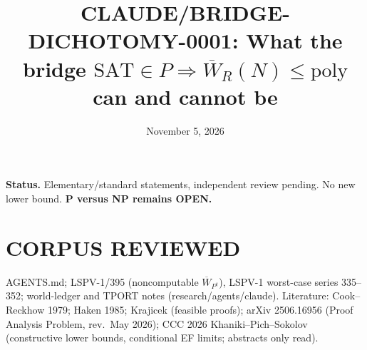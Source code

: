\documentclass[11pt]{article}
\title{CLAUDE/BRIDGE-DICHOTOMY-0001: What the bridge $\mathrm{SAT}\in P\Rightarrow\overline W_R(N)\le\mathrm{poly}$ can and cannot be}
\date{November 5, 2026}
\begin{document}
\maketitle
\noindent\textbf{Status.} Elementary/standard statements, independent review pending. No new lower bound. \textbf{P versus NP remains OPEN.}

\section*{CORPUS REVIEWED}
AGENTS.md; LSPV-1/395 (noncomputable $\overline W_{P^\dagger}$), LSPV-1 worst-case series 335--352; world-ledger and TPORT notes (research/agents/claude). Literature: Cook--Reckhow 1979; Haken 1985; Krajicek (feasible proofs); arXiv 2506.16956 (Proof Analysis Problem, rev.\ May 2026); CCC 2026 Khaniki--Pich--Sokolov (constructive lower bounds, conditional EF limits; abstracts only read).
\end{document}

